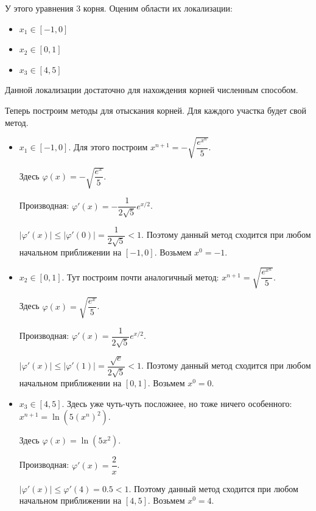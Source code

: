 		У этого уравнения 3 корня. Оценим области их локализации:
		\begin{itemize}
			\item $x_1 \in [-1, 0]$
			
			\item $x_2 \in [0, 1]$
			
			\item $x_3 \in [4, 5]$
		\end{itemize}
	
		Данной локализации достаточно для нахождения корней численным способом.
		
		Теперь построим методы для отыскания корней. Для каждого участка будет свой метод.
		
		\begin{itemize}
			\item $x_1 \in [-1, 0]$. Для этого построим $x^{n + 1} = -\sqrt{\dfrac{\displaystyle e^{x^n}}{5}}$.
			
			Здесь $\varphi(x) = -\sqrt{\dfrac{\displaystyle e^{x}}{5}}$. 
			
			Производная: $\varphi'(x) = -\dfrac{1}{2\sqrt{5}}e^{x / 2}$.
			
			$|\varphi'(x)| \leqslant |\varphi'(0)| = \dfrac{1}{2\sqrt{5}} < 1$. Поэтому данный метод сходится при любом начальном приближении на $[-1, 0]$. Возьмем $x^0 = -1$.
			\\
			
			\item $x_2 \in [0, 1]$. Тут построим почти аналогичный метод: $x^{n + 1} = \sqrt{\dfrac{\displaystyle e^{x^n}}{5}}$.
			
			Здесь $\varphi(x) = \sqrt{\dfrac{\displaystyle e^{x}}{5}}$. 
			
			Производная: $\varphi'(x) = \dfrac{1}{2\sqrt{5}}e^{x / 2}$.
			
			$|\varphi'(x)| \leqslant |\varphi'(1)| = \dfrac{\sqrt{e}}{2\sqrt{5}} < 1$. Поэтому данный метод сходится при любом начальном приближении на $[0, 1]$. Возьмем $x^0 = 0$.
			\\ 
			
			\item $x_3 \in [4, 5]$. Здесь уже чуть-чуть посложнее, но тоже ничего особенного: $x^{n + 1} = \ln(5(x^n)^2)$.
			
			Здесь $\varphi(x) = \ln(5x^2)$. 
			
			Производная: $\varphi'(x) = \dfrac{2}{x}$.
			
			$|\varphi'(x)| \leqslant \varphi'(4) = 0.5 < 1$. Поэтому данный метод сходится при любом начальном приближении на $[4, 5]$. Возьмем $x^0 = 4$.
		\end{itemize}
	
